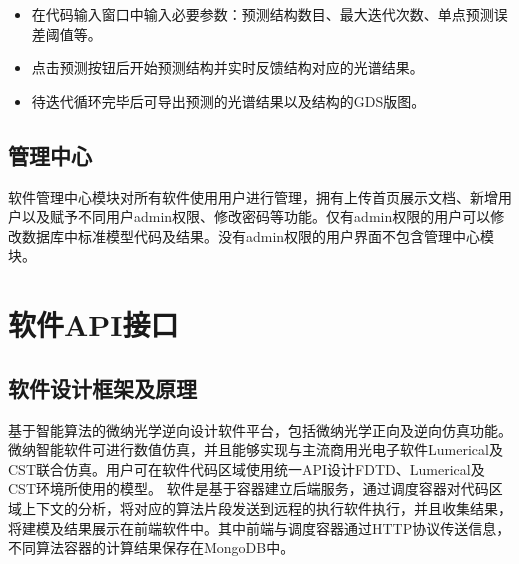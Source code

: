 \documentclass[letterpaper,10pt,english]{sphinxmanual}
\begin{document}
{{{{\sphinxAtStartPar
{}
\begin{itemize}
\item {} 
\sphinxAtStartPar
在代码输入窗口中输入必要参数：预测结构数目、最大迭代次数、单点预测误差阈值等。

\item {} 
\sphinxAtStartPar
点击预测按钮后开始预测结构并实时反馈结构对应的光谱结果。

\item {} 
\sphinxAtStartPar
待迭代循环完毕后可导出预测的光谱结果以及结构的GDS版图。


\end{itemize}

\sphinxAtStartPar
{}





\sphinxstepscope


\section{管理中心}
\label{\detokenize{_u8f6f_u4ef6_u6a21_u5757_u4ecb_u7ecd/_u7ba1_u7406_u4e2d_u5fc3/contents:id1}}\label{\detokenize{_u8f6f_u4ef6_u6a21_u5757_u4ecb_u7ecd/_u7ba1_u7406_u4e2d_u5fc3/contents::doc}}
\sphinxAtStartPar
软件管理中心模块对所有软件使用用户进行管理，拥有上传首页展示文档、新增用户以及赋予不同用户admin权限、修改密码等功能。仅有admin权限的用户可以修改数据库中标准模型代码及结果。没有admin权限的用户界面不包含管理中心模块。


\sphinxAtStartPar
{}





\sphinxstepscope


\chapter{软件API接口}
\label{\detokenize{_u8f6f_u4ef6API_u63a5_u53e3/contents:api}}\label{\detokenize{_u8f6f_u4ef6API_u63a5_u53e3/contents::doc}}
\sphinxstepscope


\section{软件设计框架及原理}
\label{\detokenize{_u8f6f_u4ef6API_u63a5_u53e3/_u8f6f_u4ef6_u8bbe_u8ba1_u6846_u67b6_u53ca_u539f_u7406/_u8f6f_u4ef6_u8bbe_u8ba1_u6846_u67b6_u53ca_u539f_u7406:id1}}\label{\detokenize{_u8f6f_u4ef6API_u63a5_u53e3/_u8f6f_u4ef6_u8bbe_u8ba1_u6846_u67b6_u53ca_u539f_u7406/_u8f6f_u4ef6_u8bbe_u8ba1_u6846_u67b6_u53ca_u539f_u7406::doc}}
\sphinxAtStartPar
基于智能算法的微纳光学逆向设计软件平台，包括微纳光学正向及逆向仿真功能。微纳智能软件可进行数值仿真，并且能够实现与主流商用光电子软件\sphinxhyphen{}Lumerical及CST联合仿真。用户可在软件代码区域使用统一API设计FDTD、Lumerical及CST环境所使用的模型。
软件是基于容器建立后端服务，通过调度容器对代码区域上下文的分析，将对应的算法片段发送到远程的执行软件执行，并且收集结果，将建模及结果展示在前端软件中。其中前端与调度容器通过HTTP协议传送信息，不同算法容器的计算结果保存在MongoDB中。


}}}}
\end{document}
